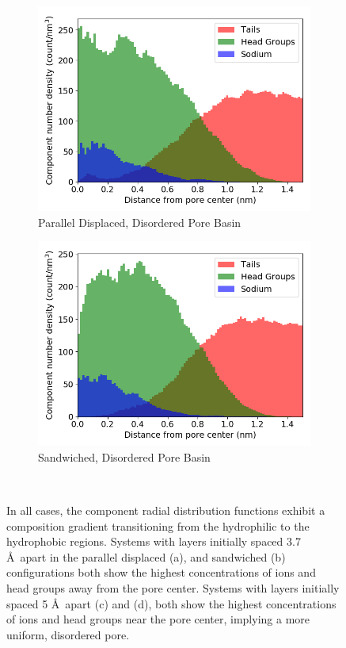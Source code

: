 \documentclass{article}
\begin{document}
\begin{figure}[!htb]
\begin{subfigure}{0.47\textwidth}
        \includegraphics[width=1\linewidth]{disordered_offset_density.png}
        \caption{Parallel Displaced, Disordered Pore Basin}
        \label{fig:disordered_offset_density}
  \end{subfigure}
  \begin{subfigure}{0.47\textwidth}
        \includegraphics[width=1\linewidth]{disordered_density.png}
        \caption{Sandwiched, Disordered Pore Basin}
        \label{fig:disorder_layered_density}
  \end{subfigure}
  \caption{In all cases, the component radial distribution functions exhibit a
	  composition gradient transitioning from the hydrophilic to the hydrophobic
	  regions. Systems with layers initially spaced 3.7 \AA~apart in the  parallel
	  displaced (a), and sandwiched (b) configurations both show the highest
	  concentrations of ions and head groups away from the pore center. Systems with
	  layers initially spaced 5 \AA~apart (c) and (d), both show the highest
	  concentrations of ions and head groups near the pore center, implying a more
	  uniform, disordered pore.}~\label{fig:densities}
  \end{figure}
  \clearpage
\end{document}
